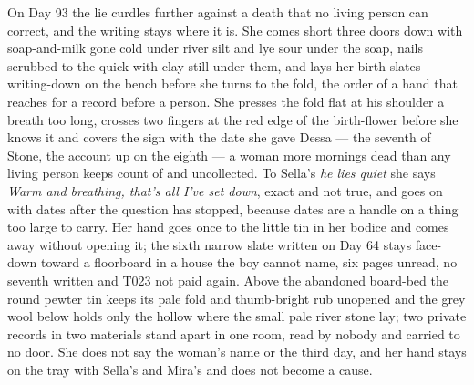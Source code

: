 \documentclass{design/chronicle}
\begin{document}
{On Day 93 the lie curdles further against a death that no living person can correct, and the writing stays where it is. She comes short three doors down with soap-and-milk gone cold under river silt and lye sour under the soap, nails scrubbed to the quick with clay still under them, and lays her birth-slates writing-down on the bench before she turns to the fold, the order of a hand that reaches for a record before a person. She presses the fold flat at his shoulder a breath too long, crosses two fingers at the red edge of the birth-flower before she knows it and covers the sign with the date she gave Dessa --- the seventh of Stone, the account up on the eighth --- a woman more mornings dead than any living person keeps count of and uncollected. To Sella’s \emph{he lies quiet} she says \emph{Warm and breathing, that’s all I’ve set down}, exact and not true, and goes on with dates after the question has stopped, because dates are a handle on a thing too large to carry. Her hand goes once to the little tin in her bodice and comes away without opening it; the sixth narrow slate written on Day 64 stays face-down toward a floorboard in a house the boy cannot name, six pages unread, no seventh written and T023 not paid again. Above the abandoned board-bed the round pewter tin keeps its pale fold and thumb-bright rub unopened and the grey wool below holds only the hollow where the small pale river stone lay; two private records in two materials stand apart in one room, read by nobody and carried to no door. She does not say the woman’s name or the third day, and her hand stays on the tray with Sella’s and Mira’s and does not become a cause.

}
\end{document}
